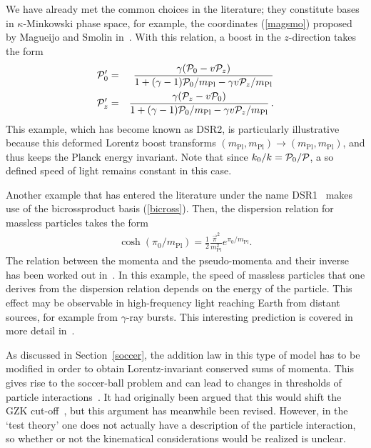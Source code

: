 \documentclass{article}
\def\beqn{\begin{eqnarray}}
\def\eeqn{\end{eqnarray}}
\begin{document}
We have already met the common choices in the literature; they constitute bases
in $\kappa$-Minkowski phase space, for example, the coordinates (\ref{magsmo}) proposed by Magueijo and Smolin in~\cite{Magueijo:2001cr}. 
With this relation, a boost in the $z$-direction takes the form
\beqn
{\cal P}'_0 &=& \frac{\gamma ({\cal P}_0 - v {\cal P}_z)}{1+ (\gamma-1){\cal P}_0/m_{\mathrm{Pl}} -  \gamma v {\cal P}_z/m_{\mathrm{Pl}}}\\
{\cal P}'_z &=& \frac{\gamma ({\cal P}_z - v {\cal P}_0)}{1+ (\gamma-1){\cal P}_0/m_{\mathrm{Pl}} - \gamma v {\cal P}_z/m_{\mathrm{Pl}}} \,.
\eeqn
This example, which has become known as {\sc DSR2}, is particularly illustrative because this deformed Lorentz boost transforms 
$(m_{\mathrm{Pl}},m_{\mathrm{Pl}}) \to (m_{\mathrm{Pl}},m_{\mathrm{Pl}})$, and thus keeps the Planck energy invariant. 
Note that since $k_0/k = {\cal P}_0/{\cal P}$, a so defined speed of light remains constant in this case.

Another example that has entered the literature under the name DSR1~\cite{Bruno:2001mw} makes use of the
bicrossproduct basis (\ref{bicross}). Then, 
the dispersion relation for massless particles takes the form
\beqn
\cosh(\pi_0/m_{\mathrm{Pl}}) = \frac{1}{2} \frac{\vec \pi^2}{m_{\mathrm{Pl}}^2} e^{\pi_0/m_{\mathrm{Pl}}} . \label{dsr1}
\eeqn
The relation between the momenta and the pseudo-momenta and their inverse has been worked out in~\cite{Judes:2002bw}.
In this example, the speed of massless particles that one derives from the dispersion relation depends
on the energy of the particle. This effect may be observable in high-frequency light reaching Earth from
distant sources, for example from $\gamma$-ray bursts. This interesting prediction is covered in more detail in~\cite{AmelinoCamelia:1999pm,AmelinoCamelia:2008qg,AmelinoCamelia:2010pd}.

As discussed in Section~\ref{soccer}, the addition law in this type of model has
to be modified in order to obtain Lorentz-invariant conserved sums of momenta. This gives rise to the soccer-ball
problem and can lead to changes in thresholds of particle interactions~\cite{AmelinoCamelia:2008qg,AmelinoCamelia:2010pd,Carmona:2010ze}.
It had originally been argued that this would shift the {\sc GZK} cut-off~\cite{AmelinoCamelia:2002gv}, but
this argument has meanwhile been revised. However, in the `test theory' one does not actually have a
description of the particle interaction, so whether or not the kinematical considerations would be
realized is unclear. 
\end{document}
